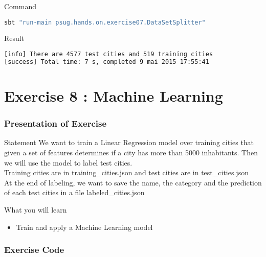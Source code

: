 \documentclass[slidetop,9pt,utf8]{beamer}
\begin{document}
\begin{CJK}{UTF8}{gbsn}
\begin{frame}[fragile]
  \begin{block}{Command}
    \begin{lstlisting}[language=bash, style=terminal]
sbt "run-main psug.hands.on.exercise07.DataSetSplitter"  
    \end{lstlisting}
  \end{block}

  \begin{block}{Result}
    \begin{lstlisting}[language=bash, style=terminal]
[info] There are 4577 test cities and 519 training cities
[success] Total time: 7 s, completed 9 mai 2015 17:55:41
    \end{lstlisting}
  \end{block}

\end{frame}

\section{Exercise 8 : Machine Learning}

\begin{frame}
  \frametitle{Presentation of Exercise}

  \begin{block}{Statement}
    We want to train a Linear Regression model over training cities that given a set of features determines if a city has more than 5000 inhabitants. Then we will use the model to label test cities. 
\\ \medskip
Training cities are in training\_cities.json and test cities are in test\_cities.json
\\ \medskip
At the end of labeling, we want to save the name, the category and the prediction of each test cities in a file labeled\_cities.json
  \end{block}

  \begin{block}{What you will learn}
    \begin{itemize}
      \item Train and apply a Machine Learning model
    \end{itemize}
  \end{block}

\end{frame}

\begin{frame}
  \frametitle{Exercise Code}

  


\end{frame}
\end{CJK}
\end{document}
